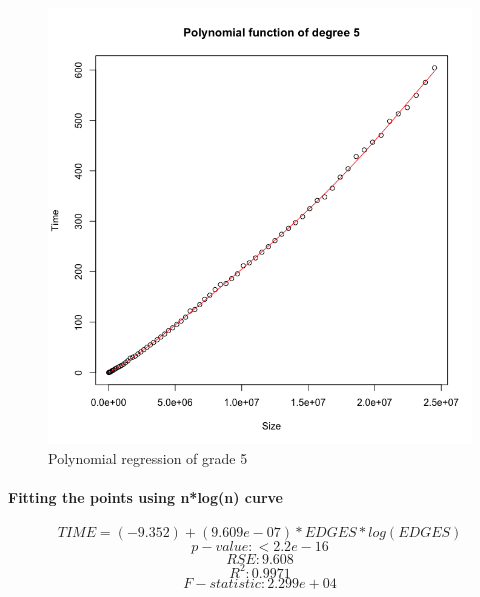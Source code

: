 \documentclass{article}
\begin{document}
\begin{figure}[H]
\centering
\includegraphics[width=\linewidth]{Rplot7.png}
\caption{Polynomial regression of grade 5}
\end{figure}




\paragraph{Fitting the points using n*log(n) curve}

$$ TIME = (-9.352) + (9.609e-07)*EDGES *log(EDGES)$$
$$ p-value: < 2.2e-16 $$
$$ RSE: 9.608$$
$$ R^{2}:  0.9971$$
$$ F-statistic: 2.299e+04$$
\end{document}
